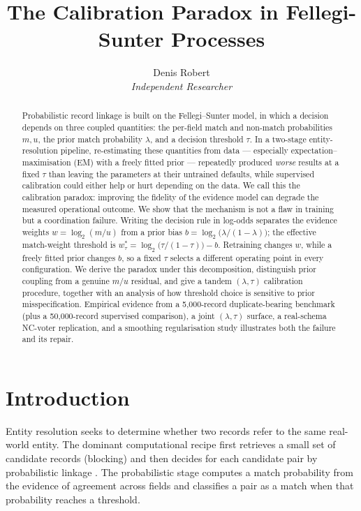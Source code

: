 \documentclass[11pt]{article}
\title{The Calibration Paradox in Fellegi-Sunter Processes}
\author{Denis Robert\\\small \textit{Independent Researcher}}
\date{}
\begin{document}
\maketitle

\begin{abstract}
Probabilistic record linkage is built on the Fellegi--Sunter model, in which a decision
depends on three coupled quantities: the per-field match and non-match probabilities
$m,u$, the prior match probability $\lambda$, and a decision threshold $\tau$. In a
two-stage entity-resolution pipeline, re-estimating these quantities from data ---
especially expectation--maximisation (EM) with a freely fitted prior --- repeatedly produced
\emph{worse} results at a fixed $\tau$ than leaving the parameters at their untrained
defaults, while supervised calibration could either help or hurt depending on the data.
We call this the calibration paradox: improving the fidelity of the evidence model can
degrade the measured operational outcome. We show that the mechanism is not a flaw in
training but a coordination failure. Writing the decision rule in log-odds separates the
evidence weights $w=\log_2(m/u)$ from a prior bias $b=\log_2\bigl(\lambda/(1-\lambda)\bigr)$;
the effective match-weight threshold is
$w_\tau^*=\log_2\bigl(\tau/(1-\tau)\bigr)-b$. Retraining changes $w$, while a freely fitted
prior changes $b$, so a fixed $\tau$ selects a different operating point in every
configuration. We derive the paradox under this decomposition, distinguish prior coupling
from a genuine $m/u$ residual, and give a tandem $(\lambda,\tau)$ calibration procedure,
together with an analysis of how threshold choice is sensitive to prior misspecification.
Empirical evidence from a 5,000-record duplicate-bearing benchmark (plus a
50,000-record supervised comparison), a joint $(\lambda,\tau)$ surface, a
real-schema NC-voter replication, and a smoothing regularisation study
illustrates both the failure and its repair.
\end{abstract}

\section{Introduction}
Entity resolution seeks to determine whether two records refer to the same real-world
entity. The dominant computational recipe first retrieves a small set of candidate records
(blocking) and then decides for each candidate pair by probabilistic linkage
\cite{fellegi1969,christen2012}. The probabilistic stage computes a match probability from
the evidence of agreement across fields and classifies a pair as a match when that
probability reaches a threshold.
\end{document}
